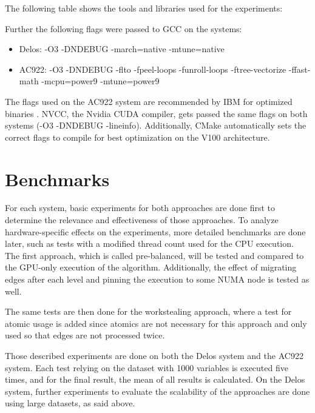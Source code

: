 The following table shows the tools and libraries used for the experiments:


Further the following flags were passed to GCC on the systems:
\begin{itemize}
  \item Delos: -O3 -DNDEBUG -march=native -mtune=native
  \item AC922: -O3 -DNDEBUG -flto -fpeel-loops -funroll-loops -ftree-vectorize -ffast-math -mcpu=power9 -mtune=power9
\end{itemize}
The flags used on the AC922 system are recommended by IBM for optimized binaries \cite{LinuxIBMPower}. NVCC, the Nvidia CUDA compiler, gets passed the same flags on both systems (-O3 -DNDEBUG -lineinfo). Additionally, CMake automatically sets the correct flags to compile for best optimization on the V100 architecture.

\section{Benchmarks}
For each system, basic experiments for both approaches are done first to determine the relevance and effectiveness of those approaches. To analyze hardware-specific effects on the experiments, more detailed benchmarks are done later, such as tests with a modified thread count used for the CPU execution.
The first approach, which is called pre-balanced, will be tested and compared to the GPU-only execution of the algorithm. Additionally, the effect of migrating edges after each level and pinning the execution to some NUMA node is tested as well.

The same tests are then done for the workstealing approach, where a test for atomic usage is added since atomics are not necessary for this approach and only used so that edges are not processed twice.

Those described experiments are done on both the Delos system and the AC922 system. Each test relying on the dataset with 1000 variables is executed five times, and for the final result, the mean of all results is calculated. On the Delos system, further experiments to evaluate the scalability of the approaches are done using large datasets, as said above.


